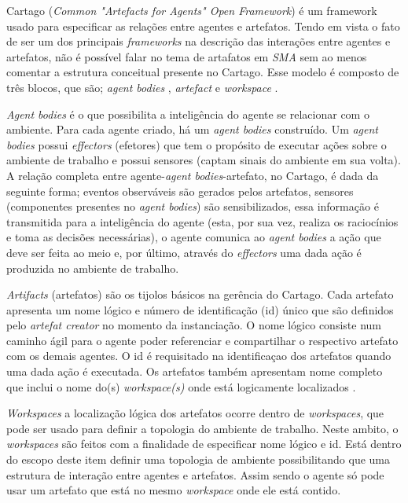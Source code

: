 Cartago (\textit{Common "Artefacts for Agents" Open Framework}) é um framework usado para especificar as relações entre agentes e artefatos. Tendo em vista o fato 
de ser um dos principais \textit{frameworks} na descrição das interações entre agentes e artefatos, não é possível falar no tema de artafatos em \textit{SMA} 
sem ao menos comentar a estrutura conceitual presente no Cartago. Esse modelo é composto de três blocos, que são; \textit{agent bodies} , \textit{artefact} e \textit{workspace} \cite{cartago}.

 \textit{Agent bodies} é  o que possibilita a inteligência do agente se relacionar com o ambiente. Para cada agente criado, há um \textit{agent bodies} construído.
 Um \textit{agent bodies} possui \textit{effectors} (efetores) que tem o propósito de executar ações sobre o ambiente de trabalho e possui sensores (captam 
 sinais do ambiente em sua volta). A relação completa entre agente-\textit{agent bodies}-artefato, no Cartago, é dada da seguinte forma; eventos observáveis são 
 gerados pelos artefatos, sensores (componentes presentes no \textit{agent bodies}) são sensibilizados, essa informação é transmitida para a inteligência do 
 agente (esta, por sua vez, realiza os raciocínios e toma as  decisões necessárias), o agente comunica ao \textit{agent bodies} a ação que deve ser feita ao 
 meio e, por último, através do \textit{effectors} uma dada ação é produzida no ambiente de trabalho. 

 \textit{Artifacts} (artefatos) são os tijolos básicos na gerência do Cartago. Cada artefato apresenta um nome lógico e número de identificação (id)
 único que são definidos pelo \textit{artefat creator} no momento da instanciação. O nome lógico consiste num caminho ágil para o agente poder referenciar 
 e compartilhar o respectivo artefato com os demais agentes. O id é requisitado na identificaçao dos artefatos quando uma dada ação é executada. Os artefatos
 também apresentam nome completo que inclui o nome do(s) \textit{workspace(s)} onde está logicamente localizados \cite{cartago}.

 \textit{Workspaces} a localização lógica dos artefatos ocorre dentro de \textit{workspaces}, que pode ser usado para definir a topologia do ambiente de trabalho.
 Neste ambito, o \textit{workspaces} são feitos com a finalidade de especificar nome lógico e id. Está dentro do escopo deste item definir uma topologia de ambiente
 possibilitando que uma estrutura de interação entre agentes e artefatos. Assim sendo o agente só pode usar
 um artefato que está no mesmo \textit{workspace} onde ele está contido. 
